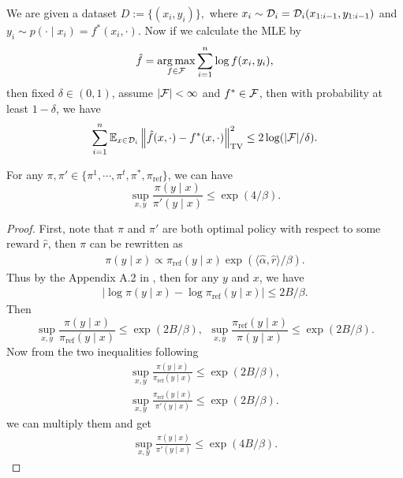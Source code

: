 \begin{lemma}\label{thm:mle}
    We are given a dataset $D:=\{(x_i,y_i)\},$ where $x_i \sim \mathcal{D}_i = \mathcal{D}_i(x_{1:i-1}, y_{1:i-1})$ and $y_i \sim p(\cdot \mid x_i) = f^*(x_i,\cdot)$. Now if we calculate the MLE by 
    \begin{align*}
        \hat{f} = \operatorname*{arg\,max}_{f \in \mathcal{F}} \sum_{i=1}^n \log f(x_i,y_i),
    \end{align*}
    then fixed $\delta \in (0,1)$, assume $|\mathcal{F}|<\infty$ and $f^* \in \mathcal{F}$, then with probability at least $1-\delta$, we have 
    \begin{align*}
        \sum_{i=1}^n \mathbb{E}_{x \in \mathcal{D}_i}\left\|\hat{f}(x,\cdot)  - f^*(x,\cdot)\right\|_{\mathrm{TV}}^2 \le 2\log (|\mathcal{F}|/\delta).
    \end{align*}
\end{lemma}
\begin{lemma}\label{lemma:policy diff}
    For any $\pi, \pi' \in \{\pi^1, \cdots, \pi^t, \pi^*, \pi_{\mathrm{ref}}\}$, we can have $$\sup_{x,y}\frac{\pi(y\mid x)}{\pi'(y\mid x)} \le \exp(4/\beta).$$
\end{lemma}
\begin{proof}
    First, note that $\pi$ and $\pi'$ are both optimal policy with respect to some reward $\hat{r}$, then $\pi$  can be rewritten as 
    \begin{gather*}
        \pi(y\mid x) \propto \pi_{\mathrm{ref}}(y\mid x) \exp(\langle \hat{\alpha}, \hat{r}\rangle/\beta).
    \end{gather*}
    Thus by the Appendix A.2 in \citep{cen2022fast}, then for any $y$ and $x$, we have 
    \begin{align*}
        |\log \pi(y\mid x) - \log \pi_{\mathrm{ref}}(y\mid x)|\le 2B/\beta.
    \end{align*}
    Then $$\sup_{x,y} \frac{\pi(y\mid x)}{\pi_{\mathrm{ref}}(y\mid x)} \le \exp(2B/\beta),\ \ \sup_{x,y}\frac{\pi_{\mathrm{ref}}(y\mid x)}{\pi(y\mid x)} \le \exp(2B/\beta).$$
    Now from the two inequalities following
    \begin{gather*}
              \sup_{x,y} \frac{\pi(y\mid x)}{\pi_{\mathrm{ref}}(y\mid x)} \le \exp(2B/\beta),\\
              \sup_{x,y} \frac{\pi_{\mathrm{ref}}(y\mid x)}{\pi'(y\mid x)} \le \exp(2B/\beta).
    \end{gather*}
    we can multiply them and get 
    \begin{align*}
        \sup_{x,y}\frac{\pi(y\mid x)}{\pi'(y\mid x)}\le \exp(4B/\beta).
    \end{align*}
\end{proof}

